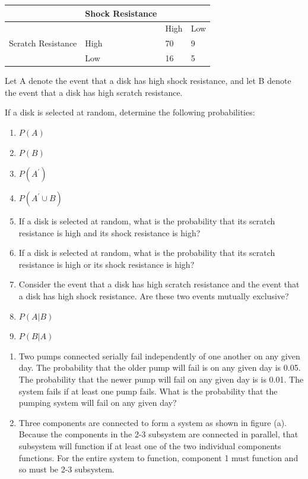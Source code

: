 \documentclass[]{book}
\providecommand{\tightlist}{%
  \setlength{\itemsep}{0pt}\setlength{\parskip}{0pt}}
\begin{document}
\begin{longtable}[]{@{}llll@{}}
\toprule
& Shock Resistance & &\tabularnewline
\midrule
\endhead
& & High & Low\tabularnewline
Scratch Resistance & High & 70 & 9\tabularnewline
& Low & 16 & 5\tabularnewline
\bottomrule
\end{longtable}

Let A denote the event that a disk has high shock resistance, and let B denote the event that a disk has high scratch resistance.

If a disk is selected at random, determine the following probabilities:

\begin{enumerate}
\def\labelenumi{(\alph{enumi})}
\tightlist
\item
  \(P(A)\)
\item
  \(P(B)\)
\item
  \(P(A^\prime)\)
\item
  \(P(A^\prime \cup B)\)
\item
  If a disk is selected at random, what is the probability that its scratch resistance is high and its shock resistance is high?
\item
  If a disk is selected at random, what is the probability that its scratch resistance is high or its shock resistance is high?
\item
  Consider the event that a disk has high scratch resistance and the event that a disk has high shock resistance. Are these two events mutually exclusive?
\item
  \(P(A|B)\)
\item
  \(P(B|A)\)
\end{enumerate}

\begin{enumerate}
\def\labelenumi{\arabic{enumi}.}
\setcounter{enumi}{13}
\item
  Two pumps connected serially fail independently of one another on any given day. The probability that the older pump will fail is on any given day is 0.05. The probability that the newer pump will fail on any given day is is 0.01. The system fails if at least one pump fails. What is the probability that the pumping system will fail on any given day?
\item
  Three components are connected to form a system as shown in ﬁgure (a). Because the components in the 2-3 subsystem are connected in parallel, that subsystem will function if at least one of the two individual components functions. For the entire system to function, component 1 must function and so must be 2-3 subsystem.
\end{enumerate}
\end{document}
